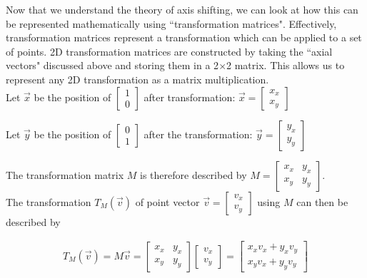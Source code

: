 \documentclass[12pt, a4paper]{article}
\begin{document}
\pagebreak

Now that we understand the theory of axis shifting, we can look at how this can
be represented mathematically using ``transformation matrices". Effectively,
transformation matrices represent a transformation which can be applied to a set
of points. 2D transformation matrices are constructed by taking the ``axial
vectors" discussed above and storing them in a 2$\times$2 matrix. This allows us
to represent any 2D transformation as a matrix multiplication. \\

Let $\vec{x}$ be the position of $\begin{bmatrix} 1 \\ 0
    \end{bmatrix}$ after transformation: $\vec{x} = \begin{bmatrix} x_x \\ x_y \end{bmatrix}$ 
    
Let $\vec{y}$ be the position of $\begin{bmatrix} 0 \\ 1\end{bmatrix}$ after the transformation: $\vec{y} =
    \begin{bmatrix}y_x \\ y_y \end{bmatrix}$
    
The transformation matrix $M$ is therefore described by $M = \begin{bmatrix} x_x & y_x \\
                x_y & y_y
    \end{bmatrix}$.\\

The transformation $T_M(\vec{v})$ of point vector $\vec{v} = \begin{bmatrix}v_x \\ v_y \end{bmatrix}$ using $M$ can then
be described by

\begin{align*}
    T_M(\vec{v}) = M\vec{v} = 
    \begin{bmatrix}
        x_x & y_x \\
        x_y & y_y
    \end{bmatrix}
    \begin{bmatrix}
        v_x \\
        v_y
    \end{bmatrix}
    =
    \begin{bmatrix}
        x_xv_x + y_xv_y \\
        x_yv_x + y_yv_y
    \end{bmatrix}
\end{align*}
\end{document}
